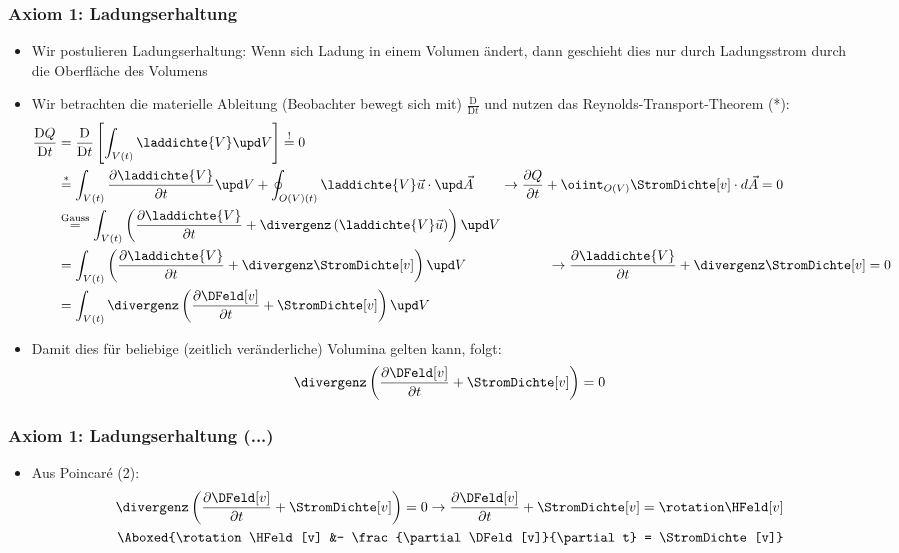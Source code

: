 \begin{frame}
  \frametitle{Axiom 1: Ladungserhaltung}
\begin{itemize}[<+->]
\item Wir postulieren Ladungserhaltung: Wenn sich Ladung in einem Volumen ändert, dann geschieht dies nur durch Ladungsstrom durch die Oberfläche des Volumens 
\item Wir betrachten die materielle Ableitung (Beobachter bewegt sich mit) $\frac{\mathrm{D}}{\mathrm{D} t}$ und nutzen das Reynolds-Transport-Theorem (*):
  \begin{align*}
\frac{\mathrm{D} Q}{\mathrm{D} t} & = \frac{\mathrm{D}}{\mathrm{D} t}\left[ \int_{V(t)} \laddichte{V} \upd V \right] \stackrel{!}{=} 0\\
 &\stackrel{*}{=} \int_{V(t)} \frac{\partial \laddichte{V}}{\partial t} \upd V + \oint_{O(V)(t)}\laddichte{V} \vec{u}\cdot \upd\vec{A} \qquad \to \frac{\partial Q}{\partial t} + \oiint_{O(V)} \StromDichte[v]\cdot d\vec{A} = 0\\
& \stackrel{\text{Gauss}}{=} \int_{V(t)} \left(\frac{\partial \laddichte{V}}{\partial t} + \divergenz \left(\laddichte{V} \vec{u} \right) \right) \upd V  \\
&= \int_{V(t)} \left(\frac{\partial \laddichte{V}}{\partial t} + \divergenz \StromDichte[v] \right) \upd V  \qquad\qquad\qquad \to \frac{\partial \laddichte{V}}{\partial t} + \divergenz \StromDichte[v] = 0 \\
&= \int_{V(t)} \divergenz \left( \frac{\partial \DFeld[v]}{\partial t} + \StromDichte[v]\right) \upd V
  \end{align*}
  \item Damit dies für beliebige (zeitlich veränderliche) Volumina gelten kann, folgt:
    \begin{equation*}
      \divergenz \left( \frac{\partial \DFeld[v]}{\partial t} + \StromDichte[v]\right) = 0
      \end{equation*}
    
    \end{itemize}

\end{frame}

\begin{frame}
  \frametitle{Axiom 1: Ladungserhaltung (...)}
\begin{itemize}[<+->]
\item Aus Poincaré (2):
  \begin{align*}
    \divergenz \left( \frac{\partial \DFeld[v]}{\partial t} + \StromDichte[v]\right) = 0 \to \frac{\partial \DFeld[v]}{\partial t} + \StromDichte[v] = \rotation\HFeld[v] &\\
    \Aboxed{\rotation\HFeld[v] &- \frac{\partial \DFeld[v]}{\partial t} = \StromDichte[v]} 
    \end{align*}
\end{itemize}
\end{frame}

